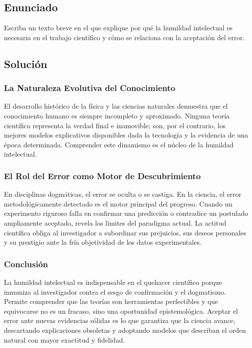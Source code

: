 \documentclass[12pt, a4paper]{article}
\begin{document}
\newpage

\subsection*{Enunciado}
Escriba un texto breve en el que explique por qué la humildad intelectual es necesaria en el trabajo científico y cómo se relaciona con la aceptación del error.

\subsection*{Solución}

\subsubsection*{La Naturaleza Evolutiva del Conocimiento}
El desarrollo histórico de la física y las ciencias naturales demuestra que el conocimiento humano es siempre incompleto y aproximado. Ninguna teoría científica representa la verdad final e inamovible; son, por el contrario, los mejores modelos explicativos disponibles dada la tecnología y la evidencia de una época determinada. Comprender este dinamismo es el núcleo de la humildad intelectual.

\subsubsection*{El Rol del Error como Motor de Descubrimiento}
En disciplinas dogmáticas, el error se oculta o se castiga. En la ciencia, el error metodológicamente detectado es el motor principal del progreso. Cuando un experimento riguroso falla en confirmar una predicción o contradice un postulado ampliamente aceptado, revela los límites del paradigma actual. La actitud científica obliga al investigador a subordinar sus prejuicios, sus deseos personales y su prestigio ante la fría objetividad de los datos experimentales. 

\subsubsection*{Conclusión}
La humildad intelectual es indispensable en el quehacer científico porque inmuniza al investigador contra el sesgo de confirmación y el dogmatismo. Permite comprender que las teorías son herramientas perfectibles y que equivocarse no es un fracaso, sino una oportunidad epistemológica. Aceptar el error ante nuevas evidencias sólidas es lo que garantiza que la ciencia avance, descartando explicaciones obsoletas y adoptando modelos que describan el orden natural con mayor exactitud y fidelidad.
\end{document}
